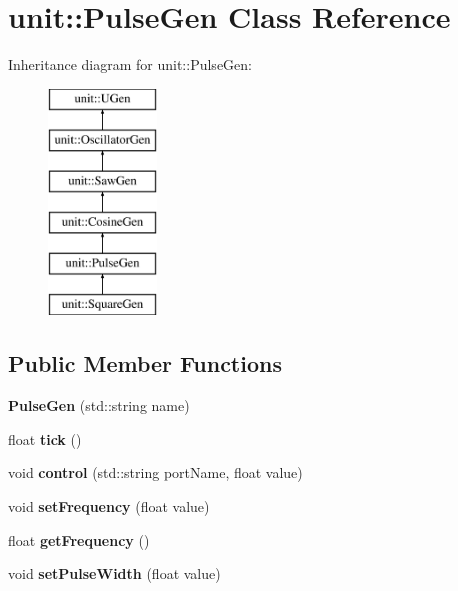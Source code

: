 \hypertarget{classunit_1_1PulseGen}{}\section{unit\+:\+:Pulse\+Gen Class Reference}
\label{classunit_1_1PulseGen}
Inheritance diagram for unit\+:\+:Pulse\+Gen\+:\begin{figure}[H]
\begin{center}
\leavevmode
\includegraphics[height=6.000000cm]{classunit_1_1PulseGen}
\end{center}
\end{figure}
\subsection*{Public Member Functions}
\begin{DoxyCompactItemize}
\item 
{\bfseries Pulse\+Gen} (std\+::string name)\hypertarget{classunit_1_1PulseGen_a466bdb3fcc244e66f2c29a9a517d4b85}{}\label{classunit_1_1PulseGen_a466bdb3fcc244e66f2c29a9a517d4b85}

\item 
float {\bfseries tick} ()\hypertarget{classunit_1_1PulseGen_a8b09b8d3cf11eb6a315bdd9b6347227d}{}\label{classunit_1_1PulseGen_a8b09b8d3cf11eb6a315bdd9b6347227d}

\item 
void {\bfseries control} (std\+::string port\+Name, float value)\hypertarget{classunit_1_1PulseGen_a581c649900c094728f4b587fb36c4f56}{}\label{classunit_1_1PulseGen_a581c649900c094728f4b587fb36c4f56}

\item 
void {\bfseries set\+Frequency} (float value)\hypertarget{classunit_1_1PulseGen_af4a027e50251040d914cdf18a87d7a73}{}\label{classunit_1_1PulseGen_af4a027e50251040d914cdf18a87d7a73}

\item 
float {\bfseries get\+Frequency} ()\hypertarget{classunit_1_1PulseGen_aa4b24157a5f5a95d1ccf0cf639598b8f}{}\label{classunit_1_1PulseGen_aa4b24157a5f5a95d1ccf0cf639598b8f}

\item 
void {\bfseries set\+Pulse\+Width} (float value)\hypertarget{classunit_1_1PulseGen_a9be5874432ee5e966542bc1b568faa61}{}\label{classunit_1_1PulseGen_a9be5874432ee5e966542bc1b568faa61}

\end{DoxyCompactItemize}
